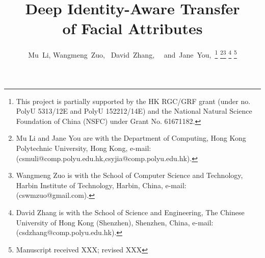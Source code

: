 \documentclass[journal]{IEEEtran}
\begin{document}
\title{Deep Identity-Aware Transfer \\of Facial Attributes}


\author{Mu~Li,
        Wangmeng~Zuo,~
        David~Zhang,~
        ~and~Jane~You,~\thanks{This project is partially supported by the HK RGC/GRF grant (under no. PolyU 5313/12E and PolyU 152212/14E) and the National Natural Science Foundation of China (NSFC) under Grant No. 61671182.}
\thanks{Mu Li and Jane You are with the Department
of Computing, Hong Kong Polytechnic University, Hong Kong, e-mail: (csmuli@comp.polyu.edu.hk,csyjia@comp.polyu.edu.hk).}\thanks{Wangmeng Zuo is with the School
of Computer Science and Technology, Harbin Institute of Technology, Harbin, China, e-mail: (cswmzuo@gmail.com).}
\thanks{David Zhang is with the School of Science and Engineering, The Chinese University of Hong Kong (Shenzhen), Shenzhen, China, e-mail: (csdzhang@comp.polyu.edu.hk).}
\thanks{Manuscript received XXX; revised XXX}}



















\maketitle
\end{document}
